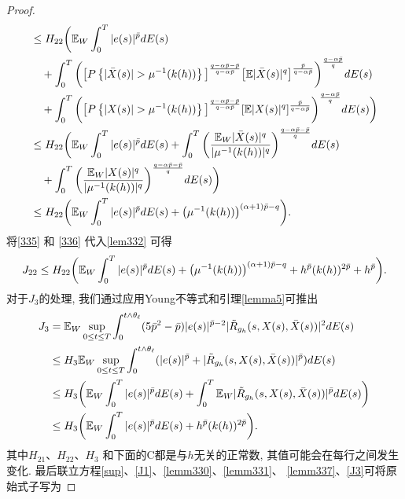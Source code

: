\begin{proof}
\begin{align}
    &\leq 
    H_{22}\bigg(\EE_{W}\int^{T}_{0}|e(s)|^{\bar{p}}dE(s)\nonumber\\
    &\quad+\int^{T}_{0}\bigg(\big[P\left\{|\bar{X}(s)|>\mu^{-1}(k(h))\right\}\big]^{\frac{q-\a\bar{p}-\bar{p}}{q-\a\bar{p}}} \big[\EE|\bar{X}(s)|^{q}\big]^{\frac{\bar{p}}{q-\a\bar{p}}}\bigg)^{\frac{q-\a\bar{p}}{q}}dE(s)\nonumber\\
    &\quad+\int^{T}_{0}\bigg(\big[P\left\{|X(s)|>\mu^{-1}(k(h))\right\}\big]^{\frac{q-\a\bar{p}-\bar{p}}{q-\a\bar{p}}}[\EE|X(s)|^{q}]^{\frac{\bar{p}}{q-\a\bar{p}}}\bigg)^{\frac{q-\a\bar{p}}{q}}dE(s)\bigg)\nonumber\\
    &\leq 
    H_{22}\bigg(\EE_{W}\int^{T}_{0}|e(s)|^{\bar{p}}dE(s)+\int^{T}_{0}\bigg(\frac{\EE_{W}|\bar{X}(s)|^{q}}{|\mu^{-1}(k(h))|^{q}}\bigg)^{\frac{q-\a\bar{p}-\bar{p}}{q}}dE(s)\nonumber\\
    &\quad+\int^{T}_{0}\bigg(\frac{\EE_{W}|X(s)|^{q}}{|\mu^{-1}(k(h))|^{q}}\bigg)^{\frac{q-\a\bar{p}-\bar{p}}{q}}dE(s)\bigg)\nonumber\\
    &\leq 
    H_{22}\bigg(\EE_{W}\int^{T}_{0}|e(s)|^{\bar{p}}dE(s)+\big(\mu^{-1}(k(h))\big)^{(\a+1)\bar{p}-q}\bigg).
\end{align}
将\eqref{335} 和 \eqref{336} 代入\eqref{lem332} 可得
\begin{align}
    \label{lemm337}
    J_{22}\leq  H_{22}\bigg(\mathbb{E}_{W}\int^{T}_{0}|e(s)|^{\bar{p}}dE(s)+\big(\mu^{-1}(k(h))\big)^{(\alpha+1)\bar{p}-q}+h^{\bar{p}}(k(h))^{2\bar{p}}+h^{\bar{p}}\bigg).
\end{align} 
对于$J_3$的处理, 我们通过应用Young不等式和引理\ref{lemma5}可推出
\begin{align}
    \label{J3}
    J_3&= \mathbb{E}_{W}\sup_{0\leq t\leq T}\int^{t\wedge\theta_{\ell}}_{0}(5\bar{p}^{2}-\bar{p})|e(s)|^{\bar{p}-2}|\tilde{R}_{g_h}(s,X(s),\bar{X}(s))|^2dE(s)\nonumber\\
    &\leq 
    H_{3}\mathbb{E}_{W}\sup_{0\leq t\leq T}\int^{t\wedge\theta_{\ell}}_{0}(|e(s)|^{\bar{p}}+|\tilde{R}_{g_h}(s,X(s),\bar{X}(s))|^{\bar{p}})dE(s)\nonumber\\
    &\leq 
    H_{3}\bigg(\mathbb{E}_{W}\int^{T}_{0}|e(s)|^{\bar{p}}dE(s)+\int^{T}_{0}\mathbb{E}_{W}|\tilde{R}_{g_h}(s,X(s),\bar{X}(s))|^{\bar{p}}dE(s)\bigg)\nonumber\\
    &\leq 
    H_{3}\bigg(\mathbb{E}_{W}\int^{T}_{0}|e(s)|^{\bar{p}}dE(s)+h^{\bar{p}}(k(h))^{2\bar{p}}\bigg).
\end{align}
其中$H_{21}$、$H_{22}$、$H_{3}$ 和下面的C都是与$h$无关的正常数, 其值可能会在每行之间发生变化. 最后联立方程\eqref{sup}、\eqref{J1}、\eqref{lemm330}、\eqref{lemm331}、 \eqref{lemm337}、\eqref{J3}可将原始式子写为

\end{proof}
